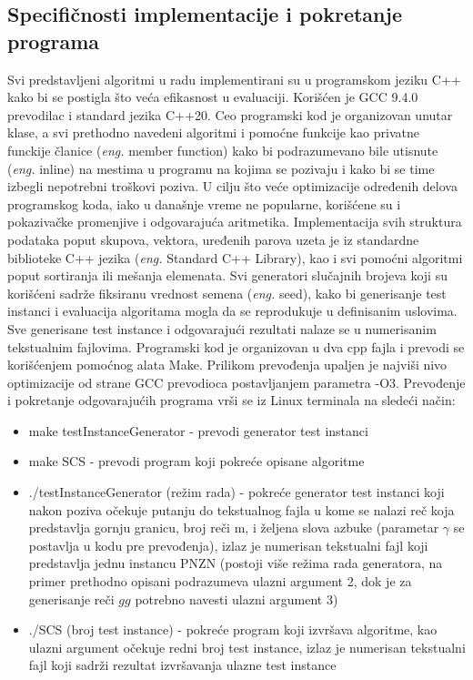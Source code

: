 \documentclass[12pt,oneside]{memoir}
\begin{document}
\subsection{Specifičnosti implementacije i pokretanje programa}
\label{sec:specifinicnostiImplementacije}
Svi predstavljeni algoritmi u radu implementirani su u programskom jeziku C++
kako bi se postigla što veća efikasnost u evaluaciji. Korišćen je
GCC 9.4.0 prevodilac i standard jezika C++20. Ceo programski kod je organizovan
unutar klase, a svi prethodno navedeni algoritmi i pomoćne funkcije kao privatne
funckije članice (\textit{eng.} member function) kako bi podrazumevano bile
utisnute (\textit{eng.} inline) na mestima u programu na kojima se pozivaju i kako
bi se time izbegli nepotrebni troškovi poziva. U cilju što veće optimizacije
određenih delova programskog koda, iako u današnje vreme ne popularne,
korišćene su i pokazivačke promenjive i odgovarajuća aritmetika. 
Implementacija svih struktura podataka poput skupova, vektora, uređenih parova
uzeta je iz standardne biblioteke C++ jezika (\textit{eng.} Standard C++ Library), kao i svi
pomoćni algoritmi poput sortiranja ili mešanja elemenata.
Svi generatori slučajnih brojeva koji su korišćeni sadrže fiksiranu
vrednost semena (\textit{eng.} seed), kako bi generisanje test instanci
i evaluacija algoritama mogla da se reprodukuje u definisanim uslovima.
Sve generisane test instance i odgovarajući rezultati nalaze se u numerisanim tekstualnim fajlovima.
Programski kod je organizovan u dva cpp fajla i prevodi se korišćenjem
pomoćnog alata Make. Prilikom prevođenja upaljen je najviši nivo
optimizacije od strane GCC prevodioca postavljanjem parametra -O3.
Prevođenje i pokretanje odgovarajućih programa vrši se
iz Linux terminala na sledeći način:
\begin{itemize}
  \item make testInstanceGenerator - prevodi generator test instanci
  \item make SCS - prevodi program koji pokreće opisane algoritme
  \item ./testInstanceGenerator (režim rada) - pokreće generator test instanci koji nakon poziva 
  očekuje putanju do tekstualnog fajla u kome se nalazi reč koja predstavlja gornju granicu,
  broj reči m, i željena slova azbuke (parametar $\gamma$ se postavlja u kodu pre prevođenja),
  izlaz je numerisan tekstualni fajl koji predstavlja jednu instancu PNZN (postoji više 
  režima rada generatora, na primer prethodno opisani podrazumeva ulazni argument 2, dok je za generisanje
  reči $gg$ potrebno navesti ulazni argument 3)
  \item ./SCS (broj test instance) - pokreće program koji izvršava algoritme,
  kao ulazni argument očekuje redni broj test instance, izlaz je numerisan tekstualni fajl
  koji sadrži rezultat izvršavanja ulazne test instance
\end{itemize}
\end{document}
